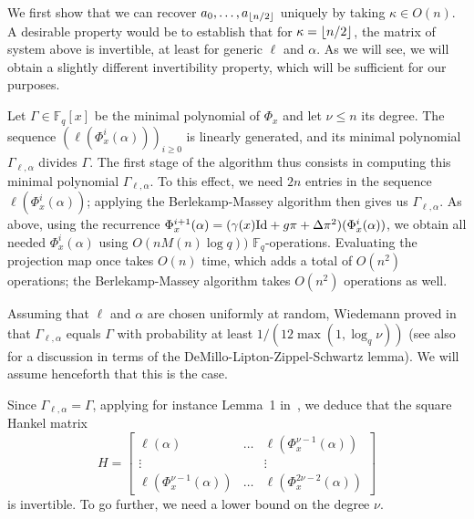 \documentclass[sigconf]{acmart}
\newcommand{\F}{\mathbb{F}}
\DeclarePairedDelimiter\floor{\lfloor}{\rfloor}
\begin{document}
We first show that we can recover $a_0,\dots,a_{\floor*{n/2}}$
uniquely by taking $\kappa \in O(n)$. A desirable property would be to
establish that for $\kappa = \floor*{n/2}$, the matrix of system above
is invertible, at least for generic $\ell$ and $\alpha$. As we will
see, we will obtain a slightly different invertibility property, which
will be sufficient for our purposes.

Let $\Gamma \in \F_q[x]$ be the minimal polynomial of $\Phi_x$ and let
$\nu \le n$ its degree.  The sequence $(\ell(\Phi_x^i(\alpha)))_{i \ge
  0}$ is linearly generated, and its minimal polynomial
$\Gamma_{\ell,\alpha}$ divides $\Gamma$. The first stage of the
algorithm thus consists in computing this minimal polynomial
$\Gamma_{\ell,\alpha}$. To this effect, we need $2n$ entries in the
sequence $\ell(\Phi_x^i(\alpha))$; applying the Berlekamp-Massey
algorithm then gives us $\Gamma_{\ell,\alpha}$.  As above, using the
recurrence $\Phi_x^{i+1}(\alpha) = (\gamma(x) {\rm Id} + g\pi + \Delta
\pi^2)(\Phi_x^i(\alpha))$, we obtain all needed $\Phi_x^i(\alpha)$ using
$O(nM(n)\log q))$ $\F_q$-operations. Evaluating the projection map
once takes $O(n)$ time, which adds a total of $O(n^2)$ operations; the
Berlekamp-Massey algorithm takes $O(n^2)$ operations as well.

Assuming that $\ell$ and $\alpha$ are chosen uniformly at random,
Wiedemann proved in~\cite{Wiedemann:1986:SSL:13738.13744} that
$\Gamma_{\ell,\alpha}$ equals $\Gamma$ with probability at least
$1/(12 \max(1, \log_q \nu))$ (see
also~\cite{Kaltofen:1991:PEP:113379.113396,Kaltofen-saun:1991:WMS:646027.676885}
for a discussion in terms of the DeMillo-Lipton-Zippel-Schwartz
lemma). We will assume henceforth that this is the case.

Since $\Gamma_{\ell,\alpha}=\Gamma$, applying for instance Lemma~1
in~\cite{Kaltofen:1991:PEP:113379.113396}, we deduce that the square
Hankel matrix
\[H=\begin{bmatrix}
   \ell(\alpha) & \ldots & \ell(\Phi_x^{\nu-1}(\alpha)) \\
    \vdots & & \vdots  \\ 
  \ell(\Phi_x^{\nu-1}(\alpha)) &  \ldots & \ell(\Phi_x^{2\nu-2}(\alpha))
\end{bmatrix} \]
is invertible. To go further, we need a lower bound on the degree $\nu$.
\end{document}
